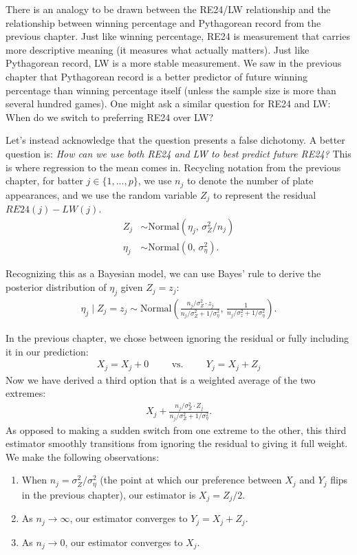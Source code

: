 \documentclass{article}
\begin{document}
      There is an analogy to be drawn between the RE24/LW relationship and the relationship between winning percentage and Pythagorean record from the previous chapter. Just like winning percentage, RE24 is measurement that carries more descriptive meaning (it measures what actually matters). Just like Pythagorean record, LW is a more stable measurement. We saw in the previous chapter that Pythagorean record is a better predictor of future winning percentage than winning percentage itself (unless the sample size is more than several hundred games). One might ask a similar question for RE24 and LW: When do we switch to preferring RE24 over LW?

      Let's instead acknowledge that the question presents a false dichotomy. A better question is: {\it How can we use both RE24 and LW to best predict future RE24?} This is where regression to the mean comes in. Recycling notation from the previous chapter, for batter $j \in \{1, ..., p\}$, we use $n_j$ to denote the number of plate appearances, and we use the random variable $Z_j$ to represent the residual $RE24(j) - LW(j)$.
      \begin{align*}
        Z_j &\sim \mbox{Normal}(\eta_j,\, \sigma^2_Z / n_j)\\
        \eta_j &\sim \mbox{Normal}(0,\, \sigma^2_\eta).
      \end{align*}

      Recognizing this as a Bayesian model, we can use Bayes' rule to derive the posterior distribution of $\eta_j$ given $Z_j = z_j$:
      \begin{align*}
        \eta_j \mid Z_j = z_j \sim \mbox{Normal}\left(\frac{n_j / \sigma^2_Z \cdot z_j}{n_j / \sigma^2_Z + 1 / \sigma^2_\eta},\, \frac{1}{n_j / \sigma^2_z + 1 / \sigma^2_\eta}\right).
      \end{align*}

      In the previous chapter, we chose between ignoring the residual or fully including it in our prediction:
      \begin{align*}
        X_j = X_j + 0 \hspace{1cm} \mbox{vs.} \hspace{1cm} Y_j = X_j + Z_j
      \end{align*}
      Now we have derived a third option that is a weighted average of the two extremes:
      \begin{align*}
        X_j + \frac{n_j / \sigma^2_Z \cdot Z_j}{n_j / \sigma^2_Z + 1 / \sigma^2_\eta}.
      \end{align*}
      As opposed to making a sudden switch from one extreme to the other, this third estimator smoothly transitions from ignoring the residual to giving it full weight. We make the following observations:
      \begin{enumerate}
        \item When $n_j = \sigma^2_Z / \sigma^2_\eta$ (the point at which our preference between $X_j$ and $Y_j$ flips in the previous chapter), our estimator is $X_j = Z_j / 2$.
        \item As $n_j \rightarrow \infty$, our estimator converges to $Y_j = X_j + Z_j$.
        \item As $n_j \rightarrow 0$, our estimator converges to $X_j$.
      \end{enumerate}
\end{document}
